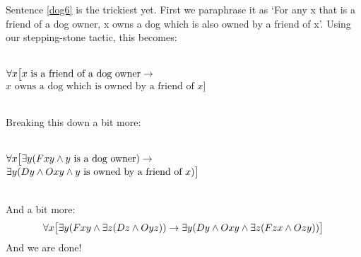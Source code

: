 Sentence \ref{dog6} is the trickiest yet. First we paraphrase it as `For any x that is a friend of a dog owner, x owns a dog which is also owned by a friend of x'. Using our stepping-stone tactic, this becomes:

\
\\$\forall x\bigl[x\text{ is a friend of a dog owner}\rightarrow \phantom{x}$\\
\phantom{x}\hfill $x\text{ owns a dog which is owned by a friend of }x\bigr]$

\
\\Breaking this down a bit more:

\
\\$\forall x\bigl[\exists y(Fxy \mathbin{\wedge} y\text{ is a dog owner})\rightarrow \phantom{x}$\\
\phantom{x}\hfill $\exists y(Dy \mathbin{\wedge} Oxy \mathbin{\wedge} y\text{ is owned by a friend of }x)\bigr]$

\
\\And a bit more:
$$\forall x\bigl[\exists y(Fxy \mathbin{\wedge} \exists z(Dz \mathbin{\wedge} Oyz)) \rightarrow \exists y(Dy \mathbin{\wedge} Oxy \mathbin{\wedge} \exists z(Fzx \mathbin{\wedge} Ozy))\bigr]$$
And we are done!


